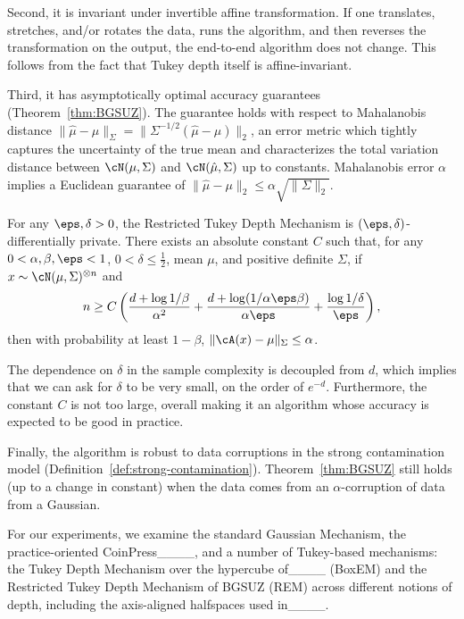 Second, it is invariant under invertible affine transformation. If one translates, stretches, and/or rotates the data, runs the algorithm, and then reverses the transformation on the output, the end-to-end algorithm does not change. 
This follows from the fact that Tukey depth itself is affine-invariant.

Third, it has asymptotically optimal accuracy guarantees (Theorem~\ref{thm:BGSUZ}). 
The guarantee holds with respect to Mahalanobis distance $\|\hat{\mu}-\mu\|_\Sigma=\|\Sigma^{-1/2}(\hat{\mu}-\mu)\|_2$, an error metric which tightly captures the uncertainty of the true mean and characterizes the total variation distance between $\cN(\mu, \Sigma)$ and $\cN(\hat{\mu}, \Sigma)$ up to constants. 
Mahalanobis error $\alpha$ implies a Euclidean guarantee of $\|\hat\mu - \mu\|_2 \leq \alpha \sqrt{\|\Sigma\|_2}$. 
\begin{thm}[Theorem 3.2____]\label{thm:BGSUZ}
    For any $\eps,\delta >0$, the Restricted Tukey Depth Mechanism is $(\eps, \delta)$-differentially private.
    There exists an absolute constant $C$ such that, for any $0<\alpha,\beta,\eps < 1$, $0<\delta\le \frac{1}{2}$, mean $\mu$, and positive definite $\Sigma$, if $x\sim \cN(\mu,\Sigma)^{\otimes n}$ and
    \begin{equation}
        n \ge C\left(\frac{d + \log 1/\beta}{\alpha^2} + \frac{d + \log(1/\alpha\eps \beta)}{\alpha\eps} +  \frac{\log 1/\delta}{\eps} \right),
    \end{equation}
    then with probability at least $1-\beta$, $\|\cA(x)-\mu\|_{\Sigma}\leq\alpha$.
\end{thm}
The dependence on $\delta$ in the sample complexity is decoupled from $d$, which implies that we can ask for $\delta$ to be very small, on the order of $e^{-d}$. 
Furthermore, the constant $C$ is not too large, overall making it an algorithm whose accuracy is expected to be good in practice.

Finally, the algorithm is robust to data corruptions in the strong contamination model (Definition~\ref{def:strong-contamination}).
Theorem~\ref{thm:BGSUZ} still holds (up to a change in constant) when the data comes from an $\alpha$-corruption of data from a Gaussian.

For our experiments, we examine the standard Gaussian Mechanism, the practice-oriented CoinPress____, and a number of Tukey-based mechanisms: the Tukey Depth Mechanism over the hypercube of____ (BoxEM) and the Restricted Tukey Depth Mechanism of BGSUZ (REM) across different notions of depth, including the axis-aligned halfspaces used in____.

